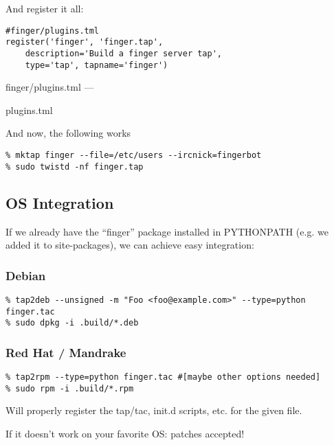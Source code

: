 And register it all:\begin{verbatim}
#finger/plugins.tml
register('finger', 'finger.tap',
	description='Build a finger server tap',
	type='tap', tapname='finger')
\end{verbatim}\parbox[b]{\linewidth}{\begin{center}finger/plugins.tml --- \begin{em}plugins.tml\end{em}\end{center}}

And now, the following works\begin{verbatim}
% mktap finger --file=/etc/users --ircnick=fingerbot
% sudo twistd -nf finger.tap
\end{verbatim}


\subsection{OS Integration}


If we already have the ``finger'' package installed in PYTHONPATH (e.g.  we added it to site-packages), we can achieve easy integration:

\subsubsection{Debian}
\begin{verbatim}
% tap2deb --unsigned -m "Foo <foo@example.com>" --type=python finger.tac
% sudo dpkg -i .build/*.deb
\end{verbatim}


\subsubsection{Red Hat / Mandrake}
\begin{verbatim}
% tap2rpm --type=python finger.tac #[maybe other options needed]
% sudo rpm -i .build/*.rpm
\end{verbatim}


Will properly register the tap/tac, init.d scripts, etc. for the given file.

If it doesn't work on your favorite OS: patches accepted!